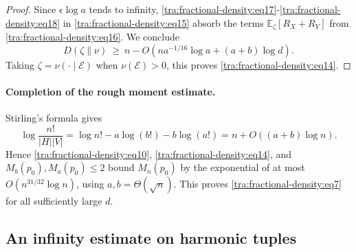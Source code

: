 \begin{proof}
Since \(\epsilon\log a\) tends to infinity, \eqref{tra:fractional-density:eq17}-\eqref{tra:fractional-density:eq18} in \eqref{tra:fractional-density:eq15} absorb the terms \(\mathbb E_\zeta[R_X+R_Y]\) from \eqref{tra:fractional-density:eq16}. We conclude
\[
 D(\zeta\|\nu)
 \ \ge\ n-O\left(n a^{-1/16}\log a+(a+b)\log d\right).
\]
Taking \(\zeta=\nu(\cdot\mid\mathcal E)\) when \(\nu(\mathcal E)>0\), this proves \eqref{tra:fractional-density:eq14}.
\end{proof}

\paragraph{Completion of the rough moment estimate.}
Stirling's formula gives
\[
 \log\frac{n!}{|H||V|}
 =\log n!-a\log(b!)-b\log(a!)
 = n + O((a+b)\log n).
\]
Hence \eqref{tra:fractional-density:eq10}, \eqref{tra:fractional-density:eq14}, and \(M_b(p_0),M_a(p_0)\le 2\) bound \(M_n(p_0)\) by the exponential of at most \(O(n^{31/32}\log n)\), using \(a,b=\Theta(\sqrt{n})\). This proves \eqref{tra:fractional-density:eq7} for all sufficiently large \(d\).

\subsection{An infinity estimate on harmonic tuples}

